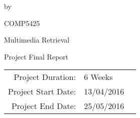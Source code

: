 \documentclass[whitelogo,12pt]{tudelft-report}
\begin{document}
%
%
\begin{titlepage}
\begin{center}


{\makeatletter
\largetitlestyle\fontsize{64}{94}\selectfont\@title
\makeatother}

{\makeatletter
\ifx\@subtitle\undefined\else
    \bigskip
   {\tudsffamily\fontsize{22}{32}\selectfont\@subtitle}    
\fi
\makeatother}

\bigskip
\bigskip
\bigskip
\bigskip
\bigskip
\bigskip

by

\bigskip
\bigskip
\bigskip


{\makeatletter
\largetitlestyle\fontsize{26}{26}\selectfont\@author
\makeatother}

\bigskip
\bigskip
\bigskip
\bigskip
\bigskip
\bigskip


\Large COMP5425

Multimedia Retrieval

Project Final Report

\bigskip
\bigskip
\bigskip
\bigskip
\bigskip
\bigskip
\bigskip
\bigskip

\begin{tabular}{rll}
    Project Duration: & 6 Weeks\\
    Project Start Date: 			& 13/04/2016\\
    Project End Date:   			& 25/05/2016
\end{tabular}

\bigskip
\bigskip

\bigskip
\bigskip



\end{center}


\end{titlepage}
\end{document}

